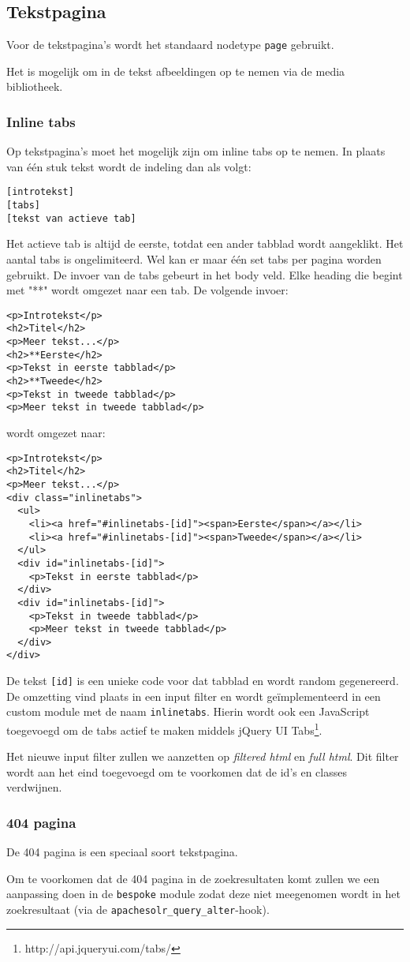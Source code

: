 \subsection{Tekstpagina}\label{tekstpagina}

Voor de tekstpagina's wordt het standaard nodetype \texttt{page} gebruikt.

Het is mogelijk om in de tekst afbeeldingen op te nemen via de media bibliotheek.

\subsubsection{Inline tabs}

Op tekstpagina's moet het mogelijk zijn om inline tabs op te nemen. In plaats van \'{e}\'{e}n stuk tekst wordt de indeling dan als volgt:
\begin{verbatim}
[introtekst]
[tabs]
[tekst van actieve tab]
\end{verbatim}
Het actieve tab is altijd de eerste, totdat een ander tabblad wordt aangeklikt. Het aantal tabs is ongelimiteerd. Wel kan er maar \'{e}\'{e}n set tabs per pagina worden gebruikt.
De invoer van de tabs gebeurt in het body veld. Elke heading die begint met "**" wordt omgezet naar een tab. De volgende invoer:
\begin{verbatim}
<p>Introtekst</p>
<h2>Titel</h2>
<p>Meer tekst...</p>
<h2>**Eerste</h2>
<p>Tekst in eerste tabblad</p>
<h2>**Tweede</h2>
<p>Tekst in tweede tabblad</p>
<p>Meer tekst in tweede tabblad</p>
\end{verbatim}
wordt omgezet naar:
\begin{verbatim}
<p>Introtekst</p>
<h2>Titel</h2>
<p>Meer tekst...</p>
<div class="inlinetabs">
  <ul>
    <li><a href="#inlinetabs-[id]"><span>Eerste</span></a></li>
    <li><a href="#inlinetabs-[id]"><span>Tweede</span></a></li>
  </ul>
  <div id="inlinetabs-[id]">
    <p>Tekst in eerste tabblad</p>
  </div>
  <div id="inlinetabs-[id]">
    <p>Tekst in tweede tabblad</p>
    <p>Meer tekst in tweede tabblad</p>
  </div>
</div>
\end{verbatim}
De tekst \texttt{[id]} is een unieke code voor dat tabblad en wordt random gegenereerd. De omzetting vind plaats in een input filter en wordt ge\"{i}mplementeerd in een custom module met de naam \texttt{inlinetabs}. Hierin wordt ook een JavaScript toegevoegd om de tabs actief te maken middels jQuery UI Tabs\footnote{http://api.jqueryui.com/tabs/}.

Het nieuwe input filter zullen we aanzetten op \emph{filtered html} en \emph{full html}. Dit filter wordt aan het eind toegevoegd om te voorkomen dat de id's en classes verdwijnen.

\subsubsection{404 pagina}\label{404pagina}

De 404 pagina is een speciaal soort tekstpagina.

Om te voorkomen dat de 404 pagina in de zoekresultaten komt zullen we een aanpassing doen in de \texttt{bespoke} module zodat deze niet meegenomen wordt in het zoekresultaat (via de \texttt{apachesolr\_query\_alter}-hook).
